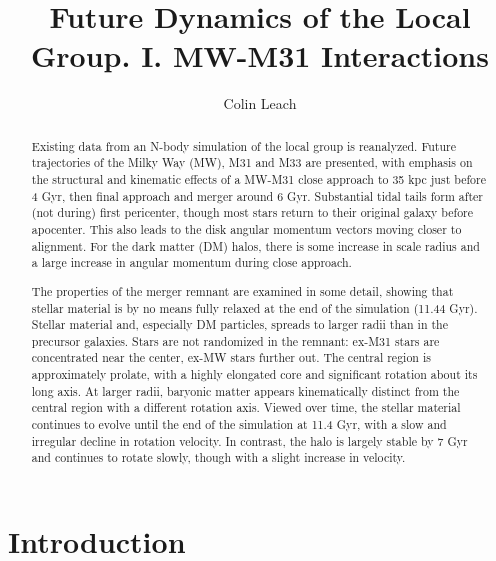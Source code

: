 \documentclass[twocolumn]{aastex63}
\newcommand{\todo}{\color{red}{TODO}\color{black}\hspace{2mm}}
\begin{document}
	
\title{Future Dynamics of the Local Group. I. MW-M31 Interactions}

\author[0000-0003-3608-1546]{Colin Leach}

\begin{abstract}
	
Existing data from an N-body simulation of the local group is reanalyzed. Future trajectories of the Milky Way (MW), M31 and M33 are presented, with emphasis on the structural and kinematic effects of a MW-M31 close approach to 35 kpc just before 4 Gyr, then final approach and merger around 6 Gyr. Substantial tidal tails form after (not during) first pericenter, though most stars return to their original galaxy before apocenter. This also leads to the disk angular momentum vectors moving closer to alignment. For the dark matter (DM) halos, there is some increase in scale radius and a large increase in angular momentum during close approach. 

The properties of the merger remnant are examined in some detail, showing that stellar material is by no means fully relaxed at the end of the simulation (11.44 Gyr). Stellar material and, especially DM particles, spreads to larger radii than in the precursor galaxies. Stars are not randomized in the remnant: ex-M31 stars are concentrated near the center, ex-MW stars further out.  The central region is approximately prolate, with a highly elongated core and significant rotation about its long axis. At larger radii, baryonic matter appears kinematically distinct from the central region with a different rotation axis. Viewed over time, the stellar material continues to evolve until the end of the simulation at 11.4 Gyr, with a slow and irregular decline in rotation velocity. In contrast, the halo is largely stable by 7 Gyr and continues to rotate slowly, though with a slight increase in velocity.

\todo{Add further concise and intelligent summary of the paper, once I get a clearer idea what it will include (and how to seem intelligent).}

	
\end{abstract}




\section{Introduction}
\end{document}
